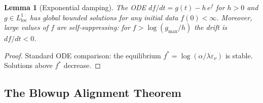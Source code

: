\documentclass[11pt]{article}
\newtheorem{lemma}[theorem]{Lemma}
\theoremstyle{definition}
\theoremstyle{remark}
\begin{document}
\begin{lemma}[Exponential damping]\label{lem:exp-damping}
  The ODE $df/dt = g(t) - h\,e^f$ for $h>0$ and $g\in L^1_{\mathrm{loc}}$ has global
  bounded solutions for any initial data $f(0)<\infty$.  Moreover, large values of
  $f$ are self-suppressing: for $f > \log(g_{\max}/h)$ the drift is $df/dt<0$.
\end{lemma}
\begin{proof}
  Standard ODE comparison: the equilibrium $f^* = \log(\alpha/\lambda\varepsilon_\nu)$
  is stable.  Solutions above $f^*$ decrease.
\end{proof}

\subsection{The Blowup Alignment Theorem}
\end{document}
